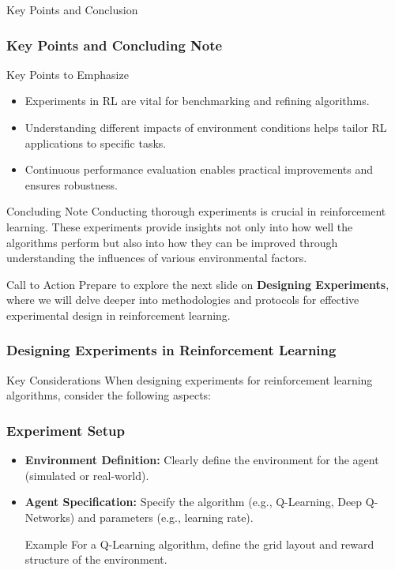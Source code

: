 \documentclass[aspectratio=169]{beamer}
\begin{document}
\begin{frame}[fragile]{Key Points and Conclusion}
    \frametitle{Key Points and Concluding Note}

    \begin{block}{Key Points to Emphasize}
        \begin{itemize}
            \item Experiments in RL are vital for benchmarking and refining algorithms.
            \item Understanding different impacts of environment conditions helps tailor RL applications to specific tasks.
            \item Continuous performance evaluation enables practical improvements and ensures robustness.
        \end{itemize}
    \end{block}

    \begin{block}{Concluding Note}
        Conducting thorough experiments is crucial in reinforcement learning. These experiments provide insights not only into how well the algorithms perform but also into how they can be improved through understanding the influences of various environmental factors.
    \end{block}

    \begin{block}{Call to Action}
        Prepare to explore the next slide on \textbf{Designing Experiments}, where we will delve deeper into methodologies and protocols for effective experimental design in reinforcement learning.
    \end{block}

\end{frame}

\begin{frame}[fragile]
    \frametitle{Designing Experiments in Reinforcement Learning}
    \begin{block}{Key Considerations}
        When designing experiments for reinforcement learning algorithms, consider the following aspects:
    \end{block}
\end{frame}

\begin{frame}[fragile]
    \frametitle{Experiment Setup}
    \begin{itemize}
        \item \textbf{Environment Definition:} Clearly define the environment for the agent (simulated or real-world).
        \item \textbf{Agent Specification:} Specify the algorithm (e.g., Q-Learning, Deep Q-Networks) and parameters (e.g., learning rate).
        \begin{exampleblock}{Example}
            For a Q-Learning algorithm, define the grid layout and reward structure of the environment.
        \end{exampleblock}
    \end{itemize}
\end{frame}
\end{document}
